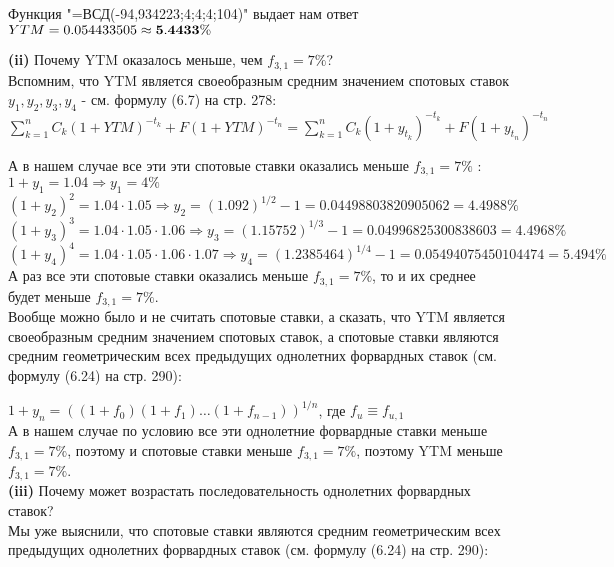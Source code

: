\documentclass{article}
\begin{document}
Функция "=ВСД({-94,934223;4;4;4;104})"  выдает нам ответ\\

 $YTM=0.054433505 \approx \bf 5.4433\%$

{\bf \large  (ii)} Почему YTM оказалось меньше, чем $f_{3,1}=7\%$?\\
Вспомним, что YTM является своеобразным средним значением спотовых ставок $y_1, y_2, y_3, y_4$ - см. формулу (6.7) на стр. 278:\\

$ \boxed {\sum\limits_{k=1}^{n} C_k(1+YTM)^{-t_k} + F(1+YTM)^{-t_n} =  \sum\limits_{k=1}^{n} C_k(1+y_{t_k})^{-t_k} + F(1+y_{t_n})^{-t_n} }$

А в нашем случае все эти эти спотовые ставки оказались меньше $f_{3,1}=7\%$ : \\

$ 1 + y_1=1.04 \Rightarrow  y_1=4\%$\\

$ (1+y_2)^2 = 1.04 \cdot 1.05  \Rightarrow  y_2=(1.092)^{1/2} - 1= 0.04498803820905062 = 4.4988\%$\\

$ (1+y_3)^3 = 1.04 \cdot 1.05 \cdot 1.06   \Rightarrow  y_3=(1.15752)^{1/3} - 1=  0.04996825300838603 = 4.4968\%$\\

$ (1+y_4)^4 = 1.04 \cdot 1.05 \cdot 1.06 \cdot 1.07   \Rightarrow  y_4=(1.2385464)^{1/4} - 1=  0.05494075450104474= 5.494\%$\\

А раз все эти спотовые ставки оказались меньше $f_{3,1}=7\%$, то и их среднее будет меньше $f_{3,1}=7\%$.\\

Вообще можно было и не считать спотовые ставки, а сказать, что YTM является своеобразным средним значением спотовых ставок, 
а спотовые ставки являются средним геометрическим всех предыдущих однолетних форвардных ставок (см. формулу (6.24) на стр. 290):

$ \boxed { 1+y_n = ((1+f_0 )(1+f_1) \dots (1+f_{n-1}))^{1/n} }$, где $f_u  \equiv f_{u,1}$\\

А в нашем случае по условию все эти однолетние форвардные ставки меньше $f_{3,1}=7\%$, 
поэтому и спотовые ставки меньше $f_{3,1}=7\%$, поэтому YTM меньше $f_{3,1}=7\%$.\\


{\bf \large  (iii)}  Почему  может возрастать последовательность однолетних форвардных ставок?\\
Мы уже выяснили, что спотовые ставки являются средним геометрическим всех предыдущих однолетних форвардных ставок (см. формулу (6.24) на стр. 290):
\end{document}

